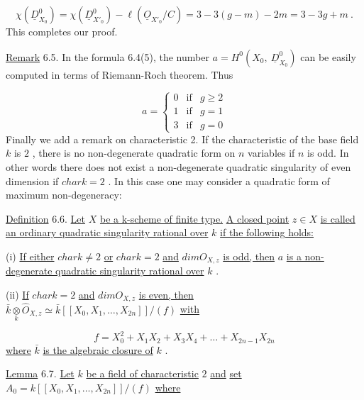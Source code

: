 \begin{equation*}
\chi(\underline{D}^0_{X_0}) = \chi(\underline{D}^0_{X'_0}) - \ell(\underline{O}_{X'_0}/C) = 3 - 3(g-m) - 2m = 3 - 3g + m \ .
\end{equation*}
This completes our proof.

\underline{Remark} 6.5.  In the formula 6.4(5), the number  $a = H^0(X_0,\ \underline{D}^0_{X_0})$  can be easily computed in terms of Riemann-Roch theorem. Thus

\begin{equation*}
a = \left\{ \begin{array}{lll} 0 & \text{if} & g \geq 2 \\[4pt] 1 & \text{if} & g = 1 \\[4pt] 3 & \text{if} & g = 0 \end{array} \right.
\end{equation*}
Finally we add a remark on characteristic 2. If the characteristic of the base field  $k$  is  $2$ , there is no non-degenerate quadratic form on  $n$  variables if  $n$  is odd. In other words there does not exist a non-degenerate quadratic singularity of even dimension if  $char k = 2$ . In this case one may consider a quadratic form of maximum non-degeneracy: 



\underline{Definition} 6.6.  \underline{Let}  $X$  \underline{be a k-scheme of finite type.} \underline{A closed point}  $z \in X$  \underline{is called an ordinary quadratic singularity rational over}  $k$  \underline{if the following holds:}

(i)  \underline{If either}  $char k \neq 2$  \underline{or}  $char k = 2$  \underline{and}  $dim O_{X,z}$  \underline{is odd, then} $a$  \underline{is a non-degenerate quadratic singularity rational over}  $k$  .

(ii)  \underline{If}  $char k = 2$  \underline{and}  $dim O_{X,z}$  \underline{is even, then} $\bar{k} \underset{k}{\otimes} \hat{O}_{X,z} \simeq \bar{k}[[X_0, X_1, \ldots, X_{2n}]]/(f)$  \underline{with}

\begin{equation*}
f = X_0^2 + X_1X_2 + X_3X_4 + \ldots + X_{2n-1}X_{2n}
\end{equation*}
\underline{where}  $\bar{k}$  \underline{is the algebraic closure of}  $k$  .

\underline{Lemma} 6.7.  \underline{Let}  $k$  \underline{be a field of characteristic}  $2$  \underline{and}  \underline{set} $A_0 = k[[X_0, X_1, \ldots ,X_{2n}]]/(f)$  \underline{where}

